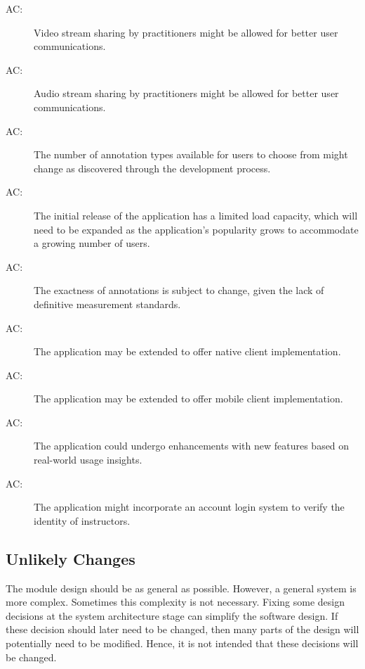 \documentclass[12pt, titlepage]{article}
\newcounter{acnum}
\newcommand{\actheacnum}{AC\theacnum}
\begin{document}
\begin{description}
\item[ \actheacnum :] Video stream sharing by practitioners might be allowed for better user communications.
\item[ \actheacnum :] Audio stream sharing by practitioners might be allowed for better user communications.
\item[ \actheacnum :] The number of annotation types available for users to choose from might change as discovered through the development process.

\item[ \actheacnum :] The initial release of the application has a limited load capacity, which will need to be expanded as the application's popularity grows to accommodate a growing number of users.

\item[ \actheacnum :] The exactness of annotations is subject to change, given the lack of definitive measurement standards.

\item[ \actheacnum :] The application may be extended to offer native client implementation.

\item[ \actheacnum :] The application may be extended to offer mobile client implementation.
\item[ \actheacnum :] The application could undergo enhancements with new features based on real-world usage insights.
\item[ \actheacnum :] The application might incorporate an account login system to verify the identity of instructors.
\end{description}

\subsection{Unlikely Changes} \label{SecUchange}

The module design should be as general as possible. However, a general system is
more complex. Sometimes this complexity is not necessary. Fixing some design
decisions at the system architecture stage can simplify the software design. If
these decision should later need to be changed, then many parts of the design
will potentially need to be modified. Hence, it is not intended that these
decisions will be changed.
\end{document}
